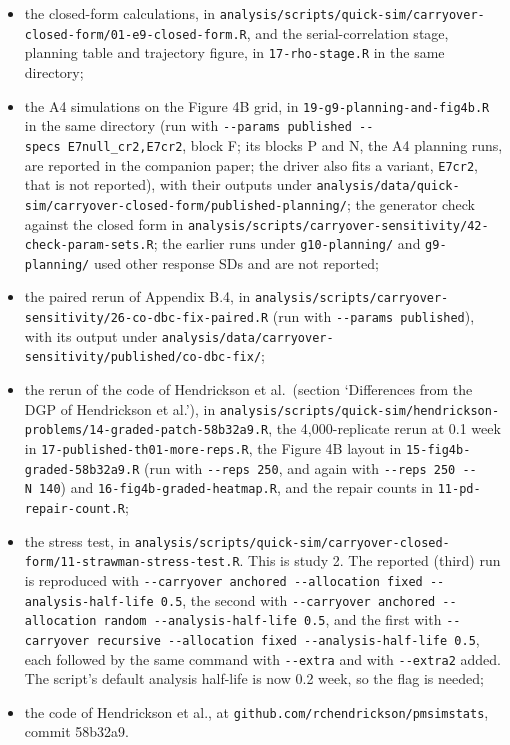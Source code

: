 \documentclass[
  11pt,
]{article}
\providecommand{\tightlist}{%
  \setlength{\itemsep}{0pt}\setlength{\parskip}{0pt}}
\begin{document}
\begin{itemize}
\tightlist
\item
  the closed-form calculations, in
  \texttt{analysis/scripts/quick-sim/carryover-closed-form/01-e9-closed-form.R},
  and the serial-correlation stage, planning table and trajectory
  figure, in \texttt{17-rho-stage.R} in the same directory;
\item
  the A4 simulations on the Figure 4B grid, in
  \texttt{19-g9-planning-and-fig4b.R} in the same directory (run with
  \texttt{-\/-params\ published\ -\/-specs\ E7null\_cr2,E7cr2}, block F; its blocks P
  and N, the A4 planning runs, are reported in the companion paper;
  the driver also fits a variant, \texttt{E7cr2}, that is not reported),
  with their outputs under
  \texttt{analysis/data/quick-sim/carryover-closed-form/published-planning/};
  the generator check against the closed form in
  \texttt{analysis/scripts/carryover-sensitivity/42-check-param-sets.R}; the
  earlier runs under \texttt{g10-planning/} and \texttt{g9-planning/} used other
  response SDs and are not reported;
\item
  the paired rerun of Appendix B.4, in
  \texttt{analysis/scripts/carryover-sensitivity/26-co-dbc-fix-paired.R}
  (run with \texttt{-\/-params\ published}), with its output under
  \texttt{analysis/data/carryover-sensitivity/published/co-dbc-fix/};
\item
  the rerun of the code of Hendrickson et al.~(section `Differences
  from the DGP of Hendrickson et al.'), in
  \texttt{analysis/scripts/quick-sim/hendrickson-problems/14-graded-patch-58b32a9.R},
  the 4,000-replicate rerun at 0.1 week in
  \texttt{17-published-th01-more-reps.R}, the Figure 4B layout in
  \texttt{15-fig4b-graded-58b32a9.R} (run with \texttt{-\/-reps\ 250}, and again with
  \texttt{-\/-reps\ 250\ -\/-N\ 140}) and \texttt{16-fig4b-graded-heatmap.R}, and the repair
  counts in \texttt{11-pd-repair-count.R};
\item
  the stress test, in
  \texttt{analysis/scripts/quick-sim/carryover-closed-form/11-strawman-stress-test.R}.
  This is study 2. The reported (third) run is reproduced with \texttt{-\/-carryover\ anchored\ -\/-allocation\ fixed\ -\/-analysis-half-life\ 0.5}, the second with
  \texttt{-\/-carryover\ anchored\ -\/-allocation\ random\ -\/-analysis-half-life\ 0.5},
  and the first with \texttt{-\/-carryover\ recursive\ -\/-allocation\ fixed\ -\/-analysis-half-life\ 0.5}, each followed
  by the same command with \texttt{-\/-extra} and with \texttt{-\/-extra2} added. The
  script's default analysis half-life is now 0.2 week, so the flag is
  needed;
\item
  the code of Hendrickson et al., at
  \texttt{github.com/rchendrickson/pmsimstats}, commit 58b32a9.
\end{itemize}
\end{document}
